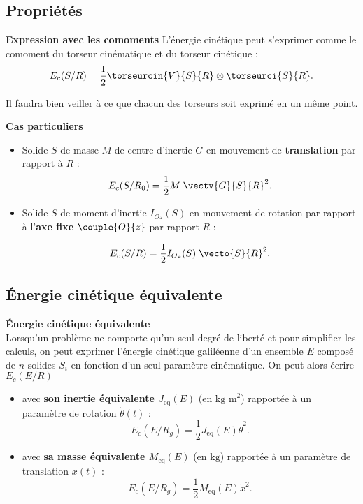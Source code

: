 \subsection{Propriétés}

\begin{prop}\textbf{Expression avec les comoments}
L'énergie cinétique peut s'exprimer comme le comoment du torseur cinématique et du torseur cinétique :
$$E_c(S/R)=\frac{1}{2}\torseurcin{V}{S}{R}\otimes \torseurci{S}{R}.
$$
\end{prop}

\begin{warn}
Il faudra bien veiller à ce que chacun des torseurs soit exprimé en un même point.
\end{warn}

\begin{prop}\textbf{Cas particuliers}~\\

\begin{itemize}
\item Solide $S$ de masse $M$ de centre d'inertie $G$ en mouvement de \textbf{translation} par rapport à $R$ :
$$
E_c(S/R_0)=\frac{1}{2}M \; \vectv{G}{S}{R}^2.
$$

\item Solide $S$ de moment d'inertie $I_{Oz}(S)$ en mouvement de rotation par rapport à l'\textbf{axe fixe} $\couple{O}{{z}}$ par rapport $R$ :

$$
E_c(S/R)=\frac{1}{2}I_{Oz}(S)\; \vecto{S}{R}^2.
$$

\end{itemize}
\end{prop}



\subsection{Énergie cinétique équivalente}

\begin{defi}\textbf{Énergie cinétique équivalente}\\
Lorsqu'un problème ne comporte qu'un seul degré de liberté et pour simplifier les calculs, on peut exprimer l'énergie cinétique galiléenne d'un ensemble $E$ composé de $n$ solides $S_i$ en fonction d'un seul paramètre cinématique.
On peut alors écrire $E_c(E/R)$ 
\begin{itemize}
\item avec \textbf{son inertie équivalente $J_{\text{eq}}(E)$} (en $\text{kg m}^2$) rapportée à un paramètre de rotation $\dot{\theta}(t)$ : 
$$
E_c(E/R_g)=\frac{1}{2}J_{\text{eq}}(E) \dot{\theta}^2.
$$
\item avec \textbf{sa masse équivalente $M_{\text{eq}}(E)$} (en $\text{kg}$) rapportée à un paramètre de translation $\dot{x}(t)$ : 
$$
E_c(E/R_g)=\frac{1}{2}M_{\text{eq}}(E) \dot{x}^2.
$$
\end{itemize}
\end{defi}

